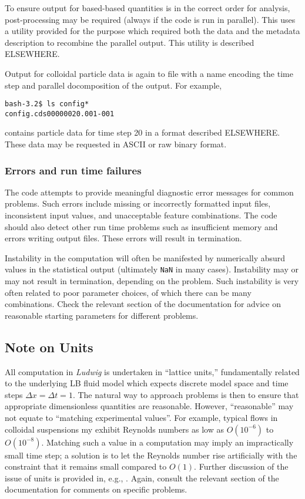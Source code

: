 To ensure output for based-based quantities is in the correct order for
analysis, post-processing
may be required (always if the code is run in parallel). This uses a utility
provided for the purpose which required both the data and the metadata
description to recombine the parallel output. This utility is described
ELSEWHERE.

Output for colloidal particle data is again to file with a name encoding
the time step and parallel docomposition of the output. For example,
\begin{lstlisting}
bash-3.2$ ls config*
config.cds00000020.001-001
\end{lstlisting}
contains particle data for time step 20 in a format described ELSEWHERE.
These data may be requested in ASCII or raw binary format.

\subsubsection{Errors and run time failures}

The code attempts to provide meaningful diagnostic error messages
for common problems. Such errors include missing or incorrectly
formatted input files, inconsistent input values, and unacceptable
feature combinations. The code should also detect other run time
problems such as insufficient memory and errors writing output
files. These errors will result in termination.

Instability in the computation will often be manifested by numerically
absurd values in the statistical output (ultimately \texttt{NaN} in
many cases). Instability may or may not result in termination, depending
on the problem. Such instability is very often related to poor parameter
choices, of which there can be many combinations. Check the
relevant section of the documentation for advice on reasonable starting
parameters for different problems.


\subsection{Note on Units}

All computation in \textit{Ludwig} is undertaken in ``lattice
units,'' fundamentally related to the underlying LB fluid model
which expects discrete model space and time steps
$\Delta x = \Delta t = 1$. The natural way to approach problems
is then to ensure that appropriate dimensionless quantities are
reasonable. However, ``reasonable'' may not equate to ``matching
experimental values''. For example, typical flows in colloidal
suspensions my exhibit Reynolds numbers as low as $O(10^{-6})$
to $O(10^{-8})$.
Matching such a value in a computation may imply an impractically
small time step; a solution is to let the Reynolds number rise
artificially with the constraint that it remains small compared to $O(1)$.
Further discussion of the issue of units is provided in, e.g.,
\cite{cates_scaling}. Again, consult the relevant section of the documentation
for comments on specific problems.


\vfill
\pagebreak

